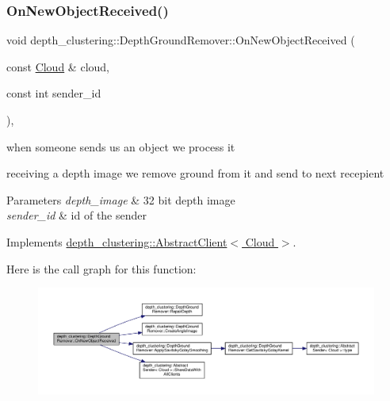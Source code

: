 \subsubsection{\texorpdfstring{On\+New\+Object\+Received()}{OnNewObjectReceived()}}
{\footnotesize\ttfamily void depth\+\_\+clustering\+::\+Depth\+Ground\+Remover\+::\+On\+New\+Object\+Received (\begin{DoxyParamCaption}\item[{const \hyperlink{classdepth__clustering_1_1Cloud}{Cloud} \&}]{cloud,  }\item[{const int}]{sender\+\_\+id }\end{DoxyParamCaption})\hspace{0.3cm}{\ttfamily [override]}, {\ttfamily [virtual]}}



when someone sends us an object we process it 

receiving a depth image we remove ground from it and send to next recepient


\begin{DoxyParams}{Parameters}
{\em depth\+\_\+image} & 32 bit depth image \\
\hline
{\em sender\+\_\+id} & id of the sender \\
\hline
\end{DoxyParams}


Implements \hyperlink{classdepth__clustering_1_1AbstractClient}{depth\+\_\+clustering\+::\+Abstract\+Client$<$ Cloud $>$}.

Here is the call graph for this function\+:\nopagebreak
\begin{figure}[H]
\begin{center}
\leavevmode
\includegraphics[width=350pt]{classdepth__clustering_1_1DepthGroundRemover_ab2c3bcc8df6cc70ad5057f5ec3bd074f_cgraph}
\end{center}
\end{figure}
\mbox{\label{classdepth__clustering_1_1DepthGroundRemover_a51dd313ed1bdda2188fb3a3fa1c5738e}} 
